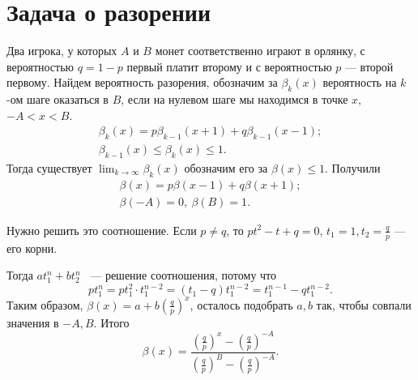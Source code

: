 \section{Задача о разорении}

\begin{example}

    Два игрока, у которых $A$ и $B$ монет соответственно играют в орлянку, с вероятностью $q=1-p$ первый платит второму и с вероятностью $p$
      --- второй первому.
      Найдем вероятность разорения, обозначим за $\beta_k(x)$ вероятность на $k$-ом шаге
      оказаться в $B$, если на нулевом шаге мы находимся в точке $x$, $-A < x < B$.
      \begin{gather*}
          \beta_k(x) = p\beta_{k - 1}(x + 1) + q\beta_{k -1}(x-1);\\
          \beta_{k - 1}(x) \le \beta_k(x) \le 1.
      \end{gather*}
     Тогда существует 
     $\lim_{k\rightarrow\infty}\beta_k(x)$ обозначим его за $\beta(x) \le 1.$
      Получили
      \begin{gather*}
          \beta(x) = p\beta(x - 1) + q\beta(x +1);\\
          \beta(-A) = 0, \ \beta(B) = 1.
      \end{gather*}
 
      Нужно решить это соотношение.
      Если $p\neq q$, то $pt^2 - t + q = 0$, $t_1 = 1, t_2 = \frac{q}{p}$ ---  его корни.
 
      Тогда $at_1^n + bt_2^n$ ~--- решение соотношения, потому что 
      $$pt_1^n = pt_1^2\cdot t_1^{n - 2} =
          (t_1 - q)t_1^{n - 2} = t_1^{n - 1} - qt_1^{n - 2}.$$
     Таким образом,
      $\beta(x) = a + b(\frac{q}{p})^x$, осталось подобрать $a, b$ так, чтобы совпали значения в $-A, B$. Итого $$\beta(x) = \frac{(\frac{q}{p})^x - (\frac{q}{p})^{-A}}{(\frac{q}{p})^B - (\frac{q}{p})^{-A}}.$$
     
  \end{example}